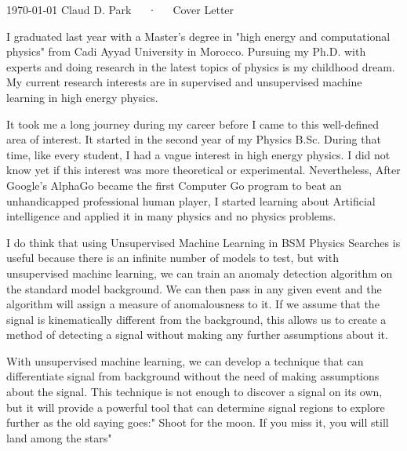 \documentclass[11pt, a4paper]{awesome-cv}
\begin{document}
\makecvheader[R]

\makecvfooter
  {\today}
  {Claud D. Park~~~·~~~Cover Letter}
  {}

\makelettertitle




\begin{cvletter}

I graduated last year with a Master's degree in "high energy and computational physics" from Cadi Ayyad University in Morocco. Pursuing my Ph.D. with experts and doing research in the latest topics of physics is my childhood dream.
My current research interests are in supervised and unsupervised machine learning in high energy physics.

It took me a long journey during my career before I came to this well-defined area of interest. It started in the second year of my Physics B.Sc. During that time, like every student, I had a vague interest in high energy physics. I did not know yet if this interest was more theoretical or experimental. Nevertheless, After Google's AlphaGo became the first Computer Go program to beat an unhandicapped professional human player, I started learning about Artificial intelligence and applied it in many physics and no physics problems.

I do think that using Unsupervised Machine Learning in BSM Physics Searches is useful because there is an infinite number of models to test, but with unsupervised machine learning, we can train an anomaly detection algorithm on the standard model background. We can then pass in any given event and the algorithm will assign a measure of anomalousness to it. If we assume that the signal is kinematically different from the background, this allows us to create a method of detecting a signal without making any further assumptions about it.

With unsupervised machine learning, we can develop a technique that can differentiate signal from background without the need of making assumptions about the signal. This technique is not enough to discover a signal on its own, but it will provide a powerful tool that can determine signal regions to explore further as the old saying goes:" Shoot for the moon. If you miss it, you will still land among the stars"


\end{cvletter}
\end{document}
